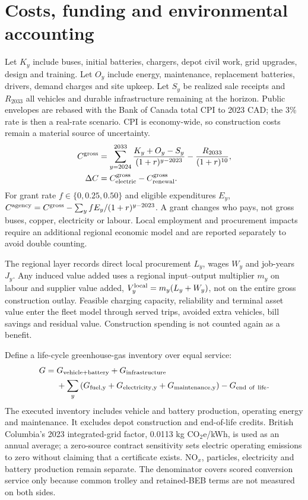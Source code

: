 \documentclass[12pt,letterpaper]{article}
\begin{document}
\section{Costs, funding and environmental accounting}
Let $K_y$ include buses, initial batteries, chargers, depot civil work, grid upgrades, design and training. Let $O_y$ include energy, maintenance, replacement batteries, drivers, demand charges and site upkeep. Let $S_y$ be realized sale receipts and $R_{2033}$ all vehicles and durable infrastructure remaining at the horizon. Public envelopes are rebased with the Bank of Canada total CPI to 2023 CAD; the 3\% rate is then a real-rate scenario.\cite{cpi2025} CPI is economy-wide, so construction costs remain a material source of uncertainty.
\begin{align}
 C^{\rm gross}
 &=\sum_{y=2024}^{2033}\frac{K_y+O_y-S_y}{(1+r)^{y-2023}}
 -\frac{R_{2033}}{(1+r)^{10}},\\
 \Delta C&=C^{\rm gross}_{\rm electric}-C^{\rm gross}_{\rm renewal}.
\end{align}
For grant rate $f\in\{0,0.25,0.50\}$ and eligible expenditures $E_y$, $C^{\rm agency}=C^{\rm gross}-\sum_y fE_y/(1+r)^{y-2023}$. A grant changes who pays, not gross buses, copper, electricity or labour. Local employment and procurement impacts require an additional regional economic model and are reported separately to avoid double counting.\cite{usdot}

The regional layer records direct local procurement \(L_y\), wages \(W_y\) and job-years \(J_y\). Any induced value added uses a regional input--output multiplier \(m_y\) on labour and supplier value added, \(V_y^{\rm local}=m_y(L_y+W_y)\), not on the entire gross construction outlay. Feasible charging capacity, reliability and terminal asset value enter the fleet model through served trips, avoided extra vehicles, bill savings and residual value. Construction spending is not counted again as a benefit.

Define a life-cycle greenhouse-gas inventory over equal service:
\begin{align}
 G={}&G_{\rm vehicle+battery}+G_{\rm infrastructure}\\
 &+\sum_y\left(G_{\rm fuel,y}+G_{\rm electricity,y}
 +G_{\rm maintenance,y}\right)-G_{\rm end\ of\ life}.
\end{align}
The executed inventory includes vehicle and battery production, operating energy and maintenance. It excludes depot construction and end-of-life credits. British Columbia's 2023 integrated-grid factor, 0.0113 kg CO$_2$e/kWh, is used as an annual average; a zero-source contract sensitivity sets electric operating emissions to zero without claiming that a certificate exists.\cite{bcgrid} NO$_x$, particles, electricity and battery production remain separate. The denominator covers scored conversion service only because common trolley and retained-BEB terms are not measured on both sides.
\end{document}
